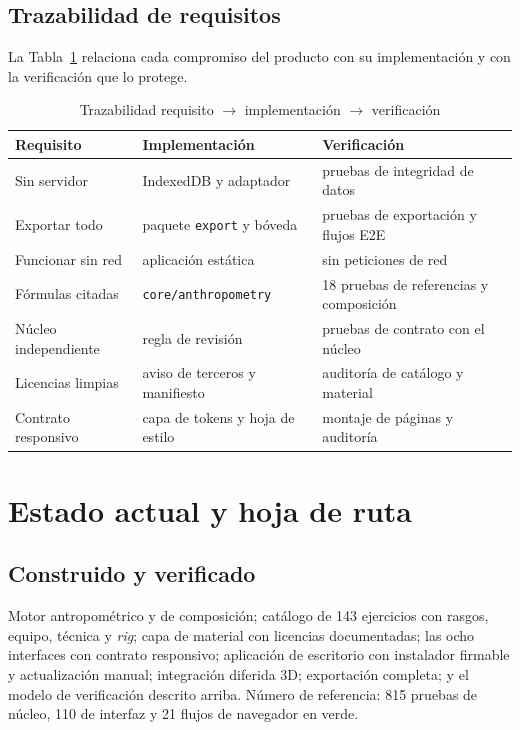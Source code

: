 \documentclass[conference]{IEEEtran}
\newcommand{\code}[1]{\texttt{\small #1}}
\begin{document}
\subsection{Trazabilidad de requisitos}
La Tabla~\ref{tab:trace} relaciona cada compromiso del producto con su
implementaci\'on y con la verificaci\'on que lo protege.

\begin{table}[t]
\caption{Trazabilidad requisito $\rightarrow$ implementaci\'on $\rightarrow$ verificaci\'on}
\label{tab:trace}
\centering
\footnotesize
\begin{tabular}{@{}p{19mm}p{31mm}p{26mm}@{}}
\toprule
Requisito & Implementaci\'on & Verificaci\'on \\
\midrule
Sin servidor & IndexedDB y adaptador & pruebas de integridad de datos \\
Exportar todo & paquete \code{export} y b\'oveda & pruebas de exportaci\'on y flujos E2E \\
Funcionar sin red & aplicaci\'on est\'atica & sin peticiones de red \\
F\'ormulas citadas & \code{core/anthropometry} & 18 pruebas de referencias y composici\'on \\
N\'ucleo independiente & regla de revisi\'on & pruebas de contrato con el n\'ucleo \\
Licencias limpias & aviso de terceros y manifiesto & auditor\'ia de cat\'alogo y material \\
Contrato responsivo & capa de tokens y hoja de estilo & montaje de p\'aginas y auditor\'ia \\
\bottomrule
\end{tabular}
\end{table}

\section{Estado actual y hoja de ruta}

\subsection{Construido y verificado}
Motor antropom\'etrico y de composici\'on; cat\'alogo de 143 ejercicios con
rasgos, equipo, t\'ecnica y \emph{rig}; capa de material con licencias
documentadas; las ocho interfaces con contrato responsivo; aplicaci\'on de
escritorio con instalador firmable y actualizaci\'on manual; integraci\'on
diferida 3D; exportaci\'on completa; y el modelo de verificaci\'on descrito
arriba. N\'umero de referencia: 815 pruebas de n\'ucleo, 110 de interfaz y 21
flujos de navegador en verde.
\end{document}

